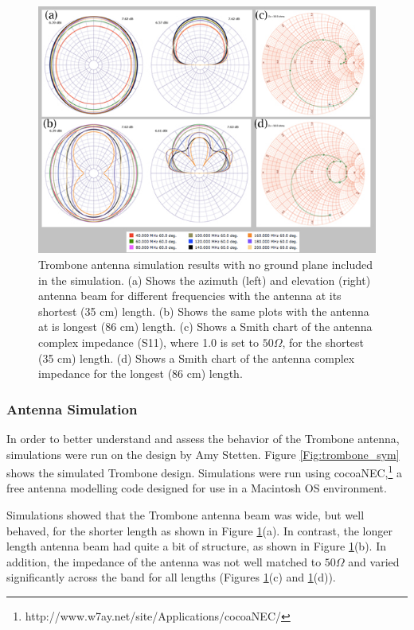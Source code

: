 \begin{figure}[htb]
\begin{center}
\includegraphics[width=0.95\linewidth]{SCIHI_system/figures/trombone_no_gp.jpg}
\caption{Trombone antenna simulation results with no ground plane included in the simulation. (a) Shows the azimuth (left) and elevation (right) antenna beam for different frequencies with the antenna at its shortest (35 cm) length. (b) Shows the same plots with the antenna at is longest (86 cm) length. (c) Shows a Smith chart of the antenna complex impedance (S11), where 1.0 is set to $50 \Omega$, for the shortest (35 cm) length. (d) Shows a Smith chart of the antenna complex impedance for the longest (86 cm) length. }
\label{Fig:trsym_nogp}
\end{center}
\end{figure}

\subsubsection{Antenna Simulation}
In order to better understand and assess the behavior of the Trombone antenna, simulations were run on the design by Amy Stetten. Figure \ref{Fig:trombone_sym} shows the simulated Trombone design. Simulations were run using cocoaNEC,\footnote{http://www.w7ay.net/site/Applications/cocoaNEC/} a free antenna modelling code designed for use in a Macintosh OS environment. 

Simulations showed that the Trombone antenna beam was wide, but well behaved, for the shorter length as shown in Figure \ref{Fig:trsym_nogp}(a). In contrast, the longer length antenna beam had quite a bit of structure, as shown in Figure \ref{Fig:trsym_nogp}(b). In addition, the impedance of the antenna was not well matched to $50 \Omega$ and varied significantly across the band for all lengths (Figures \ref{Fig:trsym_nogp}(c) and \ref{Fig:trsym_nogp}(d)). 

